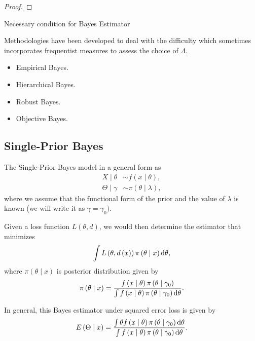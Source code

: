 \begin{proof}

\end{proof}

\begin{theorem}
	Necessary condition for Bayes Estimator
\end{theorem}

Methodologies have been developed to deal with the difficulty which sometimes incorporates frequentist measures to assess the choice of \(\Lambda\).

\begin{itemize}
	\item Empirical Bayes.
	\item Hierarchical Bayes.
	\item Robust Bayes.
	\item Objective Bayes.
\end{itemize}

\subsection{Single-Prior Bayes}

The Single-Prior Bayes model in a general form as
\begin{equation}
	\begin{aligned}
		X\mid\theta      & \sim f\left(x\mid\theta\right),         \\
		\Theta\mid\gamma & \sim \pi\left(\theta\mid\lambda\right),
	\end{aligned}
	\label{eq:single-prior-bayes}
\end{equation}
where we assume that the functional form of the prior and the value of \(\lambda\) is known (we will write it as \(\gamma=\gamma_0)\).

Given a loss function \(L\left(\theta,d\right)\), we would then determine the estimator that minimizes
\begin{equation}
	\int L\left(\theta,d\left(x\right)\right)\pi\left(\theta\mid x\right)\mathop{}\!\mathrm{d}\theta,
\end{equation}
where \(\pi\left(\theta\mid x\right)\) is posterior distribution given by
\begin{equation*}
	\pi\left(\theta\mid x\right)=\frac{f\left(x\mid\theta\right)\pi\left(\theta\mid\gamma_0\right)}{\int f\left(x\mid\theta\right)\pi\left(\theta\mid\gamma_0\right)\mathop{}\!\mathrm{d}\theta}.
\end{equation*}

In general, this Bayes estimator under squared error loss is given by
\begin{equation}
	E\left(\Theta\mid x\right) = \frac{\int\theta f\left(x\mid\theta\right)\pi\left(\theta\mid\gamma_0\right)\mathop{}\!\mathrm{d}\theta}{\int f\left(x\mid\theta\right)\pi\left(\theta\mid\gamma_0\right)\mathop{}\!\mathrm{d}\theta}.
\end{equation}

